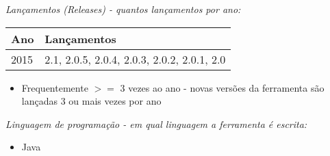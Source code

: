 \begin{description}

  \item {\it Lançamentos ({\it Releases}) - quantos lançamentos por ano:}
    \begin{table}[h!]
      \centering
      \begin{tabular}{| l | l |}
        \hline
        Ano  & Lançamentos                                 \\
        \hline
        2015 & 2.1, 2.0.5, 2.0.4, 2.0.3, 2.0.2, 2.0.1, 2.0 \\
        \hline
      \end{tabular}
    \end{table}
    \begin{itemize}
      \item Frequentemente $>=$ 3 vezes ao ano - novas versões da ferramenta são lançadas 3 ou mais vezes por ano
    \end{itemize}

  \item {\it Linguagem de programação - em qual linguagem a ferramenta é escrita:}
    \begin{itemize}
      \item Java
    \end{itemize}

\end{description}
